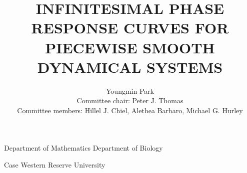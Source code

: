 \documentclass{beamer}
\begin{document}
\title{INFINITESIMAL PHASE RESPONSE CURVES FOR PIECEWISE SMOOTH DYNAMICAL SYSTEMS}
\author %
{Youngmin Park\\
Committee chair: Peter J. Thomas\\
Committee members: Hillel J. Chiel, Alethea Barbaro, Michael G. Hurley}
\institute %
{
  Department of Mathematics
  Department of Biology
  
  Case Western Reserve University
}
\frame{\titlepage}


% 




\end{document}
